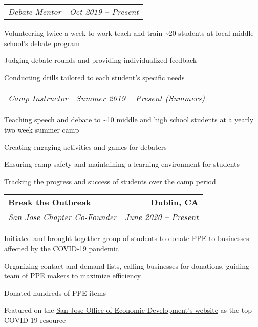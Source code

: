 \documentclass{article}
\newlength{\secskip}
\begin{document}
\goodbreak\vspace{\secskip}\par\noindent\begin{tabularx}{\linewidth}{Xr}
    \textit{Debate Mentor} & \textit{Oct 2019 -- Present}\\
\end{tabularx}
\begin{compactitem}
\item Volunteering twice a week to work teach and train \textasciitilde{}20 students at local middle school's debate program
\item Judging debate rounds and providing individualized feedback
\item Conducting drills tailored to each student's specific needs
\end{compactitem}

\goodbreak\vspace{\secskip}\par\noindent\begin{tabularx}{\linewidth}{Xr}
    \textit{Camp Instructor} & \textit{Summer 2019 -- Present (Summers)}\\
\end{tabularx}
\begin{compactitem}
\item Teaching speech and debate to \textasciitilde{}10 middle and high school students at a yearly two week summer camp
\item Creating engaging activities and games for debaters
\item Ensuring camp safety and maintaining a learning environment for students
\item Tracking the progress and success of students over the camp period
\end{compactitem}

\goodbreak\vspace{\secskip}\par\noindent\begin{tabularx}{\linewidth}{Xr}
    \textbf{Break the Outbreak} & \textbf{Dublin, CA}\\
    \textit{San Jose Chapter Co-Founder} & \textit{June 2020 -- Present}\\
\end{tabularx}
\begin{compactitem}
\item Initiated and brought together group of students to donate PPE to businesses affected by the COVID-19 pandemic
\item Organizing contact and demand lists, calling businesses for donations, guiding team of PPE makers to maximize efficiency
\item Donated hundreds of PPE items
\item Featured on the \href{https://www.sjeconomy.com/why-san-jose/covid-19-guidance/local-suppliers}{\underline{San Jose Office of Economic Development's website}} as the top COVID-19 resource
\end{compactitem}
\end{document}
